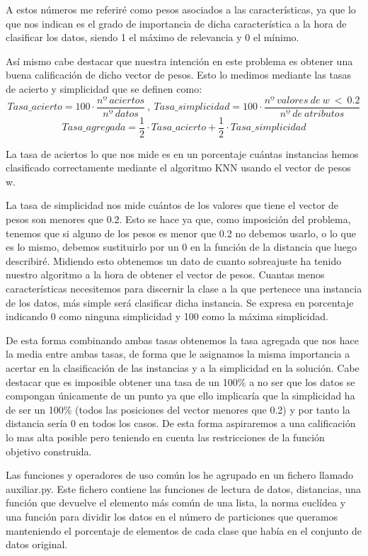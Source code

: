 \documentclass[12pt,a4paper]{article}
\begin{document}
	A estos números me referiré como pesos asociados a las características, ya que lo que nos indican es el grado de importancia de dicha característica a la hora de clasificar los datos, siendo 1 el máximo de relevancia y 0 el mínimo.

	Así mismo cabe destacar que nuestra intención en este problema es obtener una buena calificación de dicho vector de pesos. Esto lo medimos mediante las tasas de acierto y simplicidad que se definen como:
	$$Tasa\_acierto = 100\cdot \frac{nº  \ aciertos}{nº \ datos} \ , \ Tasa\_simplicidad = 100\cdot \frac{nº \ valores \ de \ w \ < \ 0.2}{nº \ de \ atributos}$$
	$$Tasa\_agregada = \frac{1}{2}\cdot Tasa\_acierto + \frac{1}{2}\cdot Tasa\_simplicidad$$

	La tasa de aciertos lo que nos mide es en un porcentaje cuántas instancias hemos clasificado correctamente mediante el algoritmo KNN usando el vector de pesos w.

	La tasa de simplicidad nos mide cuántos de los valores que tiene el vector de pesos son menores que 0.2. Esto se hace ya que, como imposición del problema, tenemos que si alguno de los pesos es menor que 0.2 no debemos usarlo, o lo que es lo mismo, debemos sustituirlo por un 0 en la función de la distancia que luego describiré. Midiendo esto obtenemos un dato de cuanto sobreajuste ha tenido nuestro algoritmo a la hora de obtener el vector de pesos. Cuantas menos características necesitemos para discernir la clase a la que pertenece una instancia de los datos, más simple será clasificar dicha instancia. Se expresa en porcentaje indicando 0 como ninguna simplicidad y 100 como la máxima simplicidad.

	De esta forma combinando ambas tasas obtenemos la tasa agregada que nos hace la media entre ambas tasas, de forma que le asignamos la misma importancia a acertar en la clasificación de las instancias y a la simplicidad en la solución. Cabe destacar que es imposible obtener una tasa de un 100\% a no ser que los datos se compongan únicamente de un punto ya que ello implicaría que la simplicidad ha de ser un 100\% (todos las posiciones del vector menores que 0.2) y por tanto la distancia sería 0 en todos los casos. De esta forma aspiraremos a una calificación lo mas alta posible pero teniendo en cuenta las restricciones de la función objetivo construida.

	Las funciones y operadores de uso común los he agrupado en un fichero llamado auxiliar.py. Este fichero contiene las funciones de lectura de datos, distancias, una función que devuelve el elemento más común de una lista, la norma euclídea y una función para dividir los datos en el número de particiones que queramos manteniendo el porcentaje de elementos de cada clase que había en el conjunto de datos original.
\end{document}
